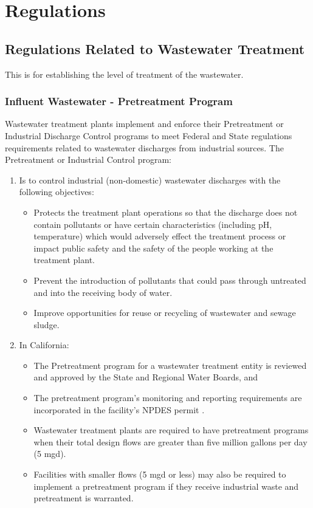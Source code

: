 \chapter{Regulations}
\section{Regulations Related to Wastewater Treatment}
This is for establishing the level of treatment of the wastewater.
\subsection{Influent Wastewater - Pretreatment Program}
Wastewater treatment plants implement and enforce their Pretreatment or Industrial Discharge Control programs to meet Federal and State regulations requirements related to wastewater discharges from industrial sources.  The  Pretreatment or Industrial Control program:
\begin{enumerate}
\item Is to control industrial (non-domestic) wastewater discharges with the following objectives:
\begin{itemize}
\item Protects the treatment plant operations so that the discharge does not contain pollutants or have certain characteristics (including pH, temperature) which would adversely effect the treatment process or impact public safety and the safety of the people working at the treatment plant.
\item Prevent the introduction of pollutants that could pass through untreated and into the receiving body of water.

\item Improve opportunities for reuse or recycling of wastewater and sewage sludge.

\end{itemize}
\item In California:
\begin{itemize}
\item The Pretreatment program for a wastewater treatment entity is reviewed and approved by the State and Regional Water Boards, and 
\item The pretreatment program's monitoring and reporting requirements are incorporated in the facility's NPDES permit .
\item Wastewater treatment plants are required to have pretreatment programs when their total design flows are greater than five million gallons per day (5 mgd). 
\item Facilities with smaller flows (5 mgd or less) may also be required to implement a pretreatment program if they receive industrial waste and pretreatment is warranted.
\end{itemize}
\end{enumerate}


